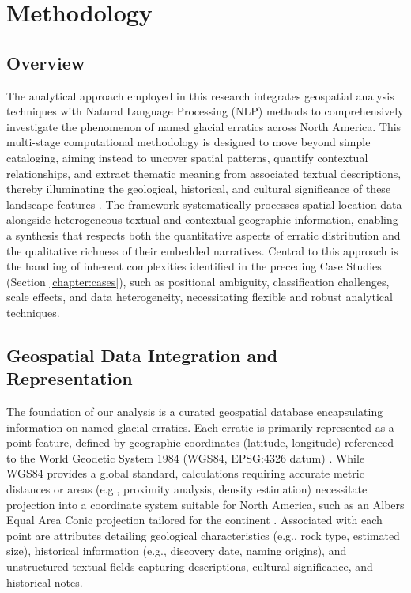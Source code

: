 \chapter{Methodology}
\label{chapter:method}

\section{Overview}
\label{sec:methodology_overview}

The analytical approach employed in this research integrates geospatial analysis techniques with Natural Language Processing (NLP) methods to comprehensively investigate the phenomenon of named glacial erratics across North America. This multi-stage computational methodology is designed to move beyond simple cataloging, aiming instead to uncover spatial patterns, quantify contextual relationships, and extract thematic meaning from associated textual descriptions, thereby illuminating the geological, historical, and cultural significance of these landscape features \cite{Gregory2013, Bodenhamer2010}. The framework systematically processes spatial location data alongside heterogeneous textual and contextual geographic information, enabling a synthesis that respects both the quantitative aspects of erratic distribution and the qualitative richness of their embedded narratives. Central to this approach is the handling of inherent complexities identified in the preceding Case Studies (Section \ref{chapter:cases}), such as positional ambiguity, classification challenges, scale effects, and data heterogeneity, necessitating flexible and robust analytical techniques.

\section{Geospatial Data Integration and Representation}
\label{sec:geospatial_data}

The foundation of our analysis is a curated geospatial database encapsulating information on named glacial erratics. Each erratic is primarily represented as a point feature, defined by geographic coordinates (latitude, longitude) referenced to the World Geodetic System 1984 (WGS84, EPSG:4326 datum) \cite{HofmannWellenhof2006}. While WGS84 provides a global standard, calculations requiring accurate metric distances or areas (e.g., proximity analysis, density estimation) necessitate projection into a coordinate system suitable for North America, such as an Albers Equal Area Conic projection tailored for the continent \cite{Snyder1987}. Associated with each point are attributes detailing geological characteristics (e.g., rock type, estimated size), historical information (e.g., discovery date, naming origins), and unstructured textual fields capturing descriptions, cultural significance, and historical notes.

